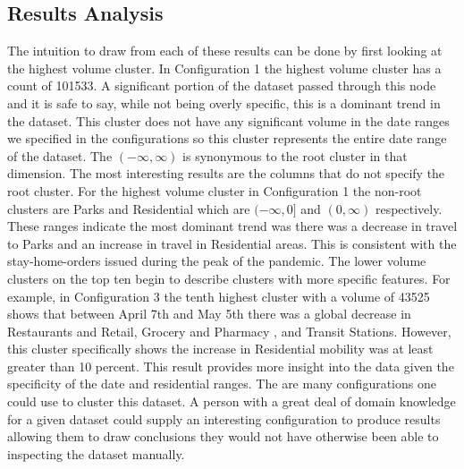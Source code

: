 \documentclass{article}
\begin{document}
\subsection{Results Analysis}
The intuition to draw from each of these results can be done by first looking at the highest volume cluster.  In Configuration 1 the highest volume cluster has a count of 101533.  A significant portion of the dataset passed through this node and it is safe to say, while not being overly specific, this is a dominant trend in the dataset.  This cluster does not have any significant volume in the date ranges we specified in the configurations so this cluster represents the entire date range of the dataset.  The \((-\infty, \infty)\) is synonymous to the root cluster in that dimension.  The most interesting results are the columns that do not specify the root cluster. For the highest volume cluster in Configuration 1 the non-root clusters are Parks and Residential which are \((-\infty, 0]\) and \((0, \infty)\) respectively.  These ranges indicate the most dominant trend was there was a decrease in travel to Parks and an increase in travel in Residential areas.  This is consistent with the stay-home-orders issued during the peak of the pandemic.  The lower volume clusters on the top ten begin to describe clusters with more specific features.  For example, in Configuration 3 the tenth highest cluster with a volume of 43525 shows that between April 7th and May 5th there was a global decrease in Restaurants and Retail, Grocery and Pharmacy , and Transit Stations.  However, this cluster specifically shows the increase in Residential mobility was at least greater than 10 percent.  This result provides more insight into the data given the specificity of the date and residential ranges.
\newline
\newline
The are many configurations one could use to cluster this dataset.  A person with a great deal of domain knowledge for a given dataset could supply an interesting configuration to produce results allowing them to draw conclusions they would not have otherwise been able to inspecting the dataset manually.  
\end{document}
